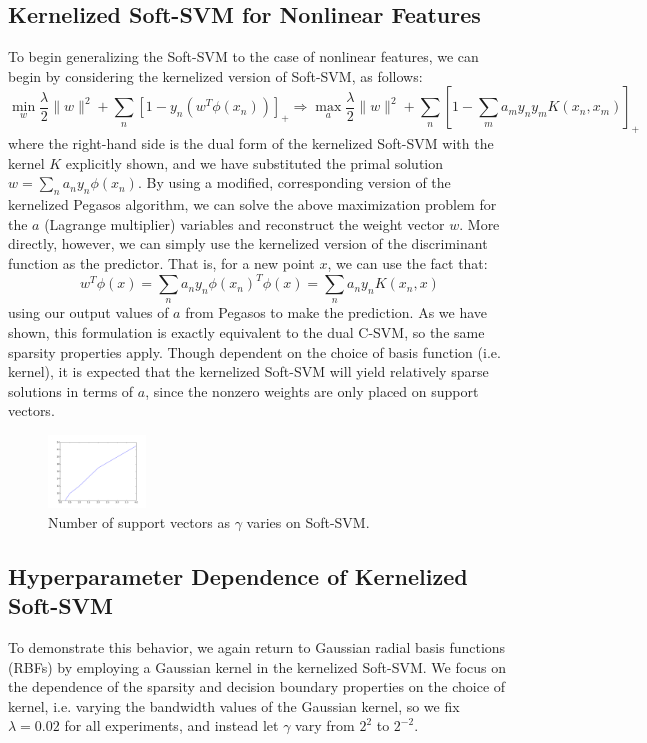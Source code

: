 \documentclass[10pt,psamsfonts]{amsart}
\theoremstyle{definition}
\theoremstyle{remark}
\numberwithin{equation}{section}
\begin{document}
\subsection{Kernelized Soft-SVM for Nonlinear Features} To begin generalizing the Soft-SVM to the case of nonlinear features, we can begin by considering the kernelized version of Soft-SVM, as follows:
$$\min_w \frac{\lambda}{2} \|w\|^2 +  \sum_n [1-y_n(w^T\phi(x_n))]_+ \Rightarrow \max_a \frac{\lambda}{2}\|w\|^2 + \sum_n \left[ 1- \sum_m a_m y_ny_m K(x_n,x_m) \right]_+$$
where the right-hand side is the dual form of the kernelized Soft-SVM with the kernel $K$ explicitly shown, and we have substituted the primal solution $w = \sum_n a_n y_n \phi(x_n)$. By using a modified, corresponding version of the kernelized Pegasos algorithm, we can solve the above maximization problem for the $a$ (Lagrange multiplier) variables and reconstruct the weight vector $w$. More directly, however, we can simply use the kernelized version of the discriminant function as the predictor. That is, for a new point $x$, we can use the fact that:
$$w^T\phi(x) = \sum_n a_n y_n \phi(x_n)^T\phi(x) = \sum_n a_n y_n K(x_n,x)$$
using our output values of $a$ from Pegasos to make the prediction. As we have shown, this formulation is exactly equivalent to the dual C-SVM, so the same sparsity properties apply. Though dependent on the choice of basis function (i.e. kernel), it is expected that the kernelized Soft-SVM will yield relatively sparse solutions in terms of $a$, since the nonzero weights are only placed on support vectors.

\begin{figure}
	\centering
	\includegraphics[width=0.23\textwidth]{hw2_3-4_sv.pdf}
	\caption{Number of support vectors as $\gamma$ varies on Soft-SVM.}
\end{figure}

\subsection{Hyperparameter Dependence of Kernelized Soft-SVM} To demonstrate this behavior, we again return to Gaussian radial basis functions (RBFs) by employing a Gaussian kernel in the kernelized Soft-SVM. We focus on the dependence of the sparsity and decision boundary properties on the choice of kernel, i.e. varying the bandwidth values of the Gaussian kernel, so we fix $\lambda = 0.02$ for all experiments, and instead let $\gamma$ vary from $2^2$ to $2^{-2}$.
\end{document}
